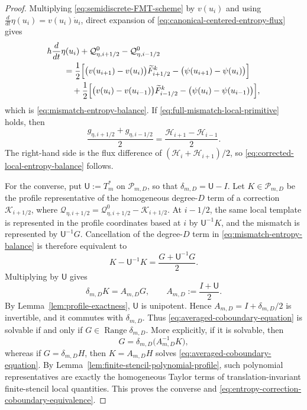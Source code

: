 \documentclass[11pt]{amsart}
\theoremstyle{plain}
\theoremstyle{definition}
\theoremstyle{remark}
\numberwithin{equation}{section}
\theoremstyle{plain}
\begin{document}
\begin{proof}
	Multiplying \eqref{eq:semidiscrete-FMT-scheme} by $v(u_i)$ and using
	$\frac{d}{dt}\eta(u_i)=v(u_i)\dot u_i$, direct expansion of
	\eqref{eq:canonical-centered-entropy-flux} gives
	\begin{align*}
	&h\frac{d}{dt}\eta(u_i)
	+\mathcal Q^0_{\eta,i+1/2}-\mathcal Q^0_{\eta,i-1/2}\notag\\
	&\qquad={}
	\frac12\Bigl[
	\bigl(v(u_{i+1})-v(u_i)\bigr)\widetilde F^k_{i+1/2}
	-\bigl(\psi(u_{i+1})-\psi(u_i)\bigr)
	\Bigr]\\
	&\qquad\quad
	+\frac12\Bigl[
	\bigl(v(u_i)-v(u_{i-1})\bigr)\widetilde F^k_{i-1/2}
	-\bigl(\psi(u_i)-\psi(u_{i-1})\bigr)
	\Bigr],
	\end{align*}
	which is \eqref{eq:mismatch-entropy-balance}.  If
	\eqref{eq:full-mismatch-local-primitive} holds, then
	\[
		\frac{g_{\eta,i+1/2}+g_{\eta,i-1/2}}{2}
		=\frac{\mathcal H_{i+1}-\mathcal H_{i-1}}{2}.
	\]
	The right-hand side is the flux difference of
	$(\mathcal H_i+\mathcal H_{i+1})/2$, so
	\eqref{eq:corrected-local-entropy-balance} follows.

	For the converse, put $\mathsf U:=T_m^*$ on $\mathscr P_{m,D}$, so that
	$\delta_{m,D}=\mathsf U-I$.  Let $K\in\mathscr P_{m,D}$ be the profile
	representative of the homogeneous degree-$D$ term of a correction
	$\mathcal K_{i+1/2}$, where
	$\mathcal Q_{\eta,i+1/2}
	=\mathcal Q^0_{\eta,i+1/2}-\mathcal K_{i+1/2}$.
	At $i-1/2$, the same local template is represented in the profile
	coordinates based at $i$ by $\mathsf U^{-1}K$, and the mismatch is represented by
	$\mathsf U^{-1}G$.  Cancellation of the degree-$D$ term in
	\eqref{eq:mismatch-entropy-balance} is therefore equivalent to
	\begin{equation}\label{eq:profile-entropy-flux-correction-equation}
		K-\mathsf U^{-1}K=\frac{G+\mathsf U^{-1}G}{2}.
	\end{equation}
	Multiplying by $\mathsf U$ gives
	\begin{equation}\label{eq:averaged-coboundary-equation}
		\delta_{m,D}K=A_{m,D}G,
		\qquad
		A_{m,D}:=\frac{I+\mathsf U}{2}.
	\end{equation}
	By Lemma~\ref{lem:profile-exactness}, $\mathsf U$ is unipotent.  Hence
	$A_{m,D}=I+\delta_{m,D}/2$ is invertible, and it commutes with
	$\delta_{m,D}$.  Thus \eqref{eq:averaged-coboundary-equation} is solvable
	if and only if $G\in\operatorname{Range}\delta_{m,D}$.  More explicitly,
	if it is solvable, then
	\[
		G=\delta_{m,D}\bigl(A_{m,D}^{-1}K\bigr),
	\]
	whereas if $G=\delta_{m,D}H$, then $K=A_{m,D}H$ solves
	\eqref{eq:averaged-coboundary-equation}.  By
	Lemma~\ref{lem:finite-stencil-polynomial-profile}, such polynomial
	representatives are exactly the homogeneous Taylor terms of
	translation-invariant finite-stencil local quantities.  This proves the
	converse and \eqref{eq:entropy-correction-coboundary-equivalence}.
\end{proof}
\end{document}
